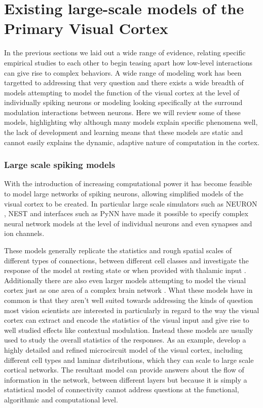 \section{Existing large-scale models of the Primary Visual Cortex}

In the previous sections we laid out a wide range of evidence,
relating specific empirical studies to each other to begin teasing
apart how low-level interactions can give rise to complex behaviors. A
wide range of modeling work has been targetted to addressing that very
question and there exists a wide breadth of models attempting to model
the function of the visual cortex at the level of individually spiking
neurons or modeling looking specifically at the surround modulation
interactions between neurons. Here we will review some of these
models, highlighting why although many models explain specific
phenomena well, the lack of development and learning means that these
models are static and cannot easily explains the dynamic, adaptive
nature of computation in the cortex.

\subsubsection{Large scale spiking models} \label{LargeModels}

With the introduction of increasing computational power it has become
feasible to model large networks of spiking neurons, allowing
simplified models of the visual cortex to be created. In particular
large scale simulators such as NEURON \citep{Hines1994}, NEST
\citep{Gewaltig2007} and interfaces such as PyNN \citep{Davison2009}
have made it possible to specify complex neural network models at the
level of individual neurons and even synapses and ion channels.

These models generally replicate the statistics and rough spatial
scales of different types of connections, between different cell
classes and investigate the response of the model at resting state or
when provided with thalamic input \citep{Shelley2002,
  Potjans2014}. Additionally there are also even larger models
attempting to model the visual cortex just as one area of a complex
brain network \citep{Eliasmith2012}. What these models have in common
is that they aren't well suited towards addressing the kinds of
question most vision scientists are interested in particularly in
regard to the way the visual cortex can extract and encode the
statistics of the visual input and give rise to well studied effects
like contextual modulation. Instead these models are usually used to
study the overall statistics of the responses. As an example,
\cite{Potjans2014} develop a highly detailed and refined microcircuit
model of the visual cortex, including different cell types and laminar
distributions, which they can scale to large scale cortical
networks. The resultant model can provide answers about the flow of
information in the network, between different layers but because it is
simply a statistical model of connectivity cannot address questions at
the functional, algorithmic and computational level.


